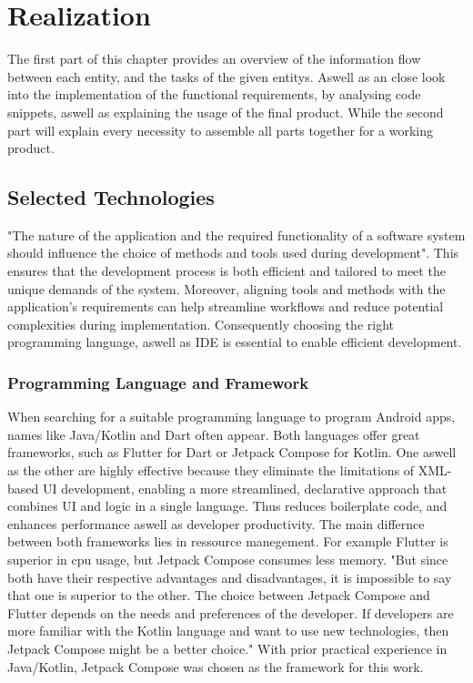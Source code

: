 
\section{Realization}\label{sec:realization}
{\large
	The first part of this chapter provides an overview of the information flow between each entity, and the tasks of the given entitys. Aswell as an close look into the implementation of the functional requirements, by analysing code snippets, aswell as explaining the usage of the final product. While the second part will explain every necessity to assemble all parts together for a working product.  
	
}
\subsection{Selected Technologies}
{\large
	"The nature of the application and the required functionality of a software system should influence the choice of methods and tools used during development". \cite{clarke}
	This ensures that the development process is both efficient and tailored to meet the unique demands of the system. Moreover, aligning tools and methods with the application's requirements can help streamline workflows and reduce potential complexities during implementation. Consequently choosing the right programming language, aswell as IDE is essential to enable efficient development.
	
	
}

\subsubsection{Programming Language and Framework}
{\large
	When searching for a suitable programming language to program Android apps, names like Java/Kotlin and Dart often appear. Both languages offer great frameworks, such as Flutter for Dart or Jetpack Compose for Kotlin. One aswell as the other are highly effective because they eliminate the limitations of XML-based UI development, enabling a more streamlined, declarative approach that combines UI and logic in a single language. Thus reduces boilerplate code, and enhances performance aswell as developer productivity. The main differnce between both frameworks lies in ressource manegement. For example Flutter is superior in cpu usage, but Jetpack Compose consumes less memory. \cite{fwComparison} "But since both have their respective advantages and
	disadvantages, it is impossible to say that one is superior to the other. The choice between Jetpack Compose and Flutter depends on the needs and preferences of the developer. If developers are more familiar with the Kotlin language and want to use new technologies, then Jetpack Compose might be a better choice." \cite{fwComparison} With prior practical experience in Java/Kotlin, Jetpack Compose was chosen as the framework for this work. 
	
}




